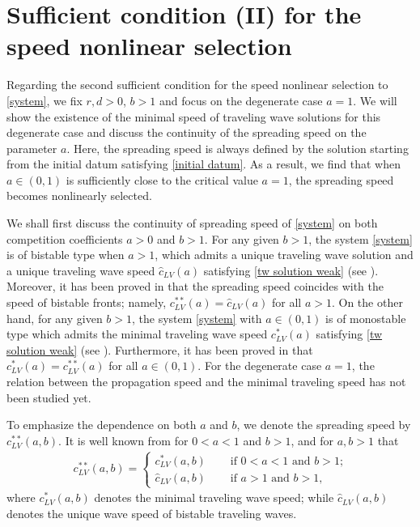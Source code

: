 \documentclass[11pt,a4paper]{article}
\numberwithin{equation}{section}
\numberwithin{figure}{section}
\newcommand{\red}[1]{{\color{red}#1}}
\newcommand\bea{\begin{eqnarray}}
\newcommand\eea{\end{eqnarray}}
\begin{document}
\section{Sufficient condition (II) for the speed nonlinear selection}


Regarding the second sufficient condition for the speed nonlinear selection to \eqref{system}, 
we fix $r,d>0$, \red{$b>1$} and 
focus on the degenerate case $a=1$. 
We will show the existence of the \red{minimal speed} of traveling wave solutions for this degenerate case and discuss the continuity of the spreading speed on the parameter $a$. 
Here, the spreading speed is always defined by the solution starting from the initial datum satisfying \eqref{initial datum}. 
As a result, we find that when $a\in(0,1)$ is sufficiently close to the critical value $a=1$, the spreading speed becomes nonlinearly selected.

We shall first discuss the continuity of spreading speed of \eqref{system} on both competition coefficients $a>0$ and $b>1$. 
For any given $b>1$, the system \eqref{system} is of bistable type when $a>1$, which admits a unique traveling wave solution and a unique traveling wave speed $\hat c_{LV}(a)$ satisfying \eqref{tw solution weak} (see \cite{Kan-On}). Moreover, it has been proved in \cite{Carrere,Peng Wu Zhou} that the spreading speed coincides with the speed of bistable fronts; namely, $c^{**}_{LV}(a)=\hat c_{LV}(a)$ for all $a>1$.
On the other hand, for any given $b>1$,
the system \eqref{system} with $a\in(0,1)$ is of monostable type which admits the minimal traveling wave speed $c^*_{LV}(a)$ satisfying \eqref{tw solution weak} (see \cite{Kan-on1997}). Furthermore, it has been proved in \cite{Lewis Li Weinberger 2} that $c^*_{LV}(a)=c^{**}_{LV}(a)$ for all $a\in(0,1)$. For the degenerate case $a=1$, the relation between the propagation speed and the minimal traveling speed has not been studied yet. 



To emphasize the dependence on both $a$ and $b$, we denote the spreading speed by $c^{**}_{LV}(a,b)$.
It is well known from \cite{Lewis Li Weinberger 2} for $0<a<1$ and $b>1$,
and  \cite{Carrere, Peng Wu Zhou} for $a,b>1$ that
\bea\label{spreading speed}
c^{**}_{LV}(a,b)=\begin{cases}
c^{*}_{LV}(a,b) &\quad \mbox{ if $0<a<1$ and  $b>1$;}\\
\hat{c}_{LV}(a,b) &\quad \mbox{ if $a>1$ and $b>1$},
\end{cases}
\eea
where $c^{*}_{LV}(a,b)$ denotes the minimal traveling wave speed; while 
$\hat{c}_{LV}(a,b)$ denotes the unique wave speed of bistable traveling waves.   
\end{document}
